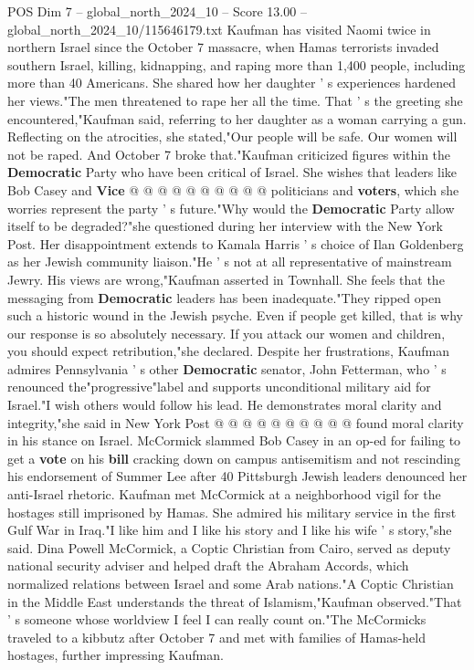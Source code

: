 \begin{textsample}{POS Dim 7 – global\_north\_2024\_10 – Score 13.00 – global\_north\_2024\_10/115646179.txt}
Kaufman has visited Naomi twice in northern Israel since the October 7 massacre, when Hamas terrorists invaded southern Israel, killing, kidnapping, and raping more than 1,400 people, including more than 40 Americans.
She shared how her daughter ' s experiences hardened her views."The men threatened to rape her all the time.
That ' s the greeting she encountered,"Kaufman said, referring to her daughter as a woman carrying a gun.
Reflecting on the atrocities, she stated,"Our people will be safe.
Our women will not be raped.
And October 7 broke that."Kaufman criticized figures within the \textbf{Democratic} Party who have been critical of Israel.
She wishes that leaders like Bob Casey and \textbf{Vice} @ @ @ @ @ @ @ @ @ @ politicians and \textbf{voters}, which she worries represent the party ' s future."Why would the \textbf{Democratic} Party allow itself to be degraded?"she questioned during her interview with the New York Post.
Her disappointment extends to Kamala Harris ' s choice of Ilan Goldenberg as her Jewish community liaison."He ' s not at all representative of mainstream Jewry.
His views are wrong,"Kaufman asserted in Townhall.
She feels that the messaging from \textbf{Democratic} leaders has been inadequate."They ripped open such a historic wound in the Jewish psyche.
Even if people get killed, that is why our response is so absolutely necessary.
If you attack our women and children, you should expect retribution,"she declared.
Despite her frustrations, Kaufman admires Pennsylvania ' s other \textbf{Democratic} senator, John Fetterman, who ' s renounced the"progressive"label and supports unconditional military aid for Israel."I wish others would follow his lead.
He demonstrates moral clarity and integrity,"she said in New York Post @ @ @ @ @ @ @ @ @ @ found moral clarity in his stance on Israel.
McCormick slammed Bob Casey in an op-ed for failing to get a \textbf{vote} on his \textbf{bill} cracking down on campus antisemitism and not rescinding his endorsement of Summer Lee after 40 Pittsburgh Jewish leaders denounced her anti-Israel rhetoric.
Kaufman met McCormick at a neighborhood vigil for the hostages still imprisoned by Hamas.
She admired his military service in the first Gulf War in Iraq."I like him and I like his story and I like his wife ' s story,"she said.
Dina Powell McCormick, a Coptic Christian from Cairo, served as deputy national security adviser and helped draft the Abraham Accords, which normalized relations between Israel and some Arab nations."A Coptic Christian in the Middle East understands the threat of Islamism,"Kaufman observed."That ' s someone whose worldview I feel I can really count on."The McCormicks traveled to a kibbutz after October 7 and met with families of Hamas-held hostages, further impressing Kaufman.

\end{textsample}
